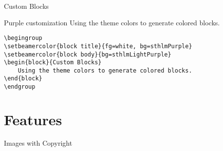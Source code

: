 \documentclass[newPxFont]{beamer}
\begin{document}

\begin{frame}[containsverbatim]{Custom Blocks}
\begingroup
{}
\begin{block}{Purple customization}
  Using the theme colors to generate colored blocks.
\end{block}
\endgroup
\begin{verbatim}
\begingroup
\setbeamercolor{block title}{fg=white, bg=sthlmPurple}
\setbeamercolor{block body}{bg=sthlmLightPurple}
\begin{block}{Custom Blocks}
    Using the theme colors to generate colored blocks.
\end{block}
\endgroup
\end{verbatim}
\end{frame}


%
%
\section{Features}


\begin{frame}{Images with Copyright}
  \begin{figure}
    \centering
  \end{figure}
\end{frame}

\end{document}
